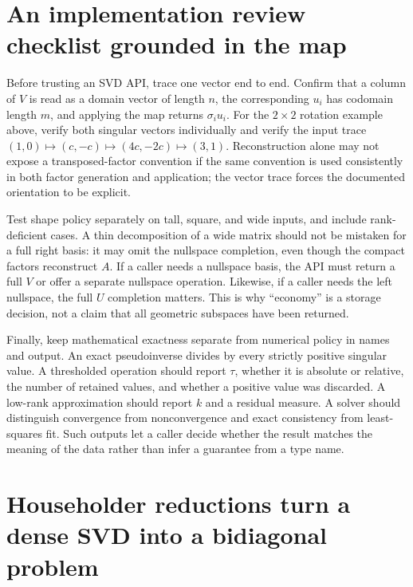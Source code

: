 \section{An implementation review checklist grounded in the map}\label{02-foundations-ii-ch038-an-implementation-review-checklist-grounded-in-the-map}

Before trusting an SVD API, trace one vector end to end. Confirm that a column of \(V\) is read as a domain vector of length \(n\), the corresponding \(u_i\) has codomain length \(m\), and applying the map returns \(\sigma_i u_i\). For the \(2\times2\) rotation example above, verify both singular vectors individually and verify the input trace \((1,0)\mapsto(c,-c)\mapsto(4c,-2c)\mapsto(3,1)\). Reconstruction alone may not expose a transposed-factor convention if the same convention is used consistently in both factor generation and application; the vector trace forces the documented orientation to be explicit.

Test shape policy separately on tall, square, and wide inputs, and include rank-deficient cases. A thin decomposition of a wide matrix should not be mistaken for a full right basis: it may omit the nullspace completion, even though the compact factors reconstruct \(A\). If a caller needs a nullspace basis, the API must return a full \(V\) or offer a separate nullspace operation. Likewise, if a caller needs the left nullspace, the full \(U\) completion matters. This is why ``economy'' is a storage decision, not a claim that all geometric subspaces have been returned.

Finally, keep mathematical exactness separate from numerical policy in names and output. An exact pseudoinverse divides by every strictly positive singular value. A thresholded operation should report \(\tau\), whether it is absolute or relative, the number of retained values, and whether a positive value was discarded. A low-rank approximation should report \(k\) and a residual measure. A solver should distinguish convergence from nonconvergence and exact consistency from least-squares fit. Such outputs let a caller decide whether the result matches the meaning of the data rather than infer a guarantee from a type name.

\section{Householder reductions turn a dense SVD into a bidiagonal problem}\label{02-foundations-ii-ch038-householder-reductions-turn-a-dense-svd-into-a-bidiagonal-problem}

